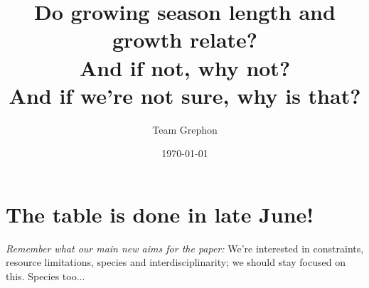 \documentclass[11pt,letter]{article}
\begin{document}

\renewcommand{\refname}{\CHead{}}

\title{Do growing season length and growth relate? \\ And if not, why not? \\ And if we're not sure, why is that?}
\author{Team Grephon}
\date{\today}
\maketitle

\tableofcontents

\section{The table is done in late June!}

\emph{Remember what our main new aims for the paper:}
We're interested in constraints, resource limitations, species and interdisciplinarity; we should stay focused on this. Species too... 
\end{document}
